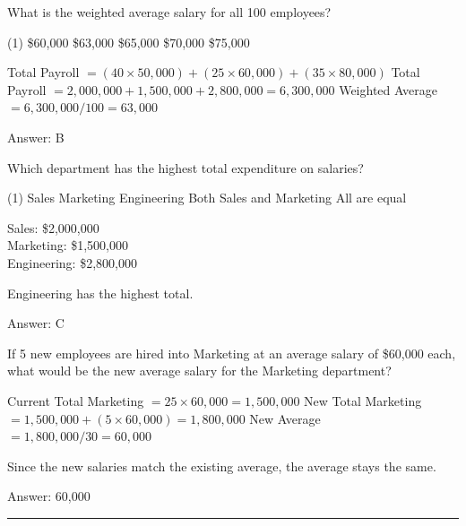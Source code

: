 \documentclass[11pt,paper=a4,answers]{exam}
\begin{document}
\begin{questions}
\question
What is the weighted average salary for all 100 employees?

\begin{tasks}(1)
\task[A)] \$60,000 \task[B)] \$63,000 \task[C)] \$65,000 \task[D)] \$70,000 \task[E)] \$75,000
\end{tasks}

\begin{solution}
\begin{center}
Total Payroll $= (40 \times 50,000) + (25 \times 60,000) + (35 \times 80,000)$
\vspace{5pt}
Total Payroll $= 2,000,000 + 1,500,000 + 2,800,000 = 6,300,000$
\vspace{5pt}
Weighted Average $= 6,300,000 / 100 = 63,000$
\end{center}

Answer: \colorbox{yellow!100}{B}
\end{solution}

\vspace{1cm}

\question
Which department has the highest total expenditure on salaries?

\begin{tasks}(1)
\task[A)] Sales \task[B)] Marketing \task[C)] Engineering \task[D)] Both Sales and Marketing \task[E)] All are equal
\end{tasks}

\begin{solution}
\begin{center}
Sales: \$2,000,000 \\
Marketing: \$1,500,000 \\
Engineering: \$2,800,000
\end{center}
Engineering has the highest total.

Answer: \colorbox{yellow!100}{C}
\end{solution}

\vspace{1cm}

\question
If 5 new employees are hired into Marketing at an average salary of \$60,000 each, what would be the new average salary for the Marketing department?

\begin{solution}
\begin{center}
Current Total Marketing $= 25 \times 60,000 = 1,500,000$
\vspace{5pt}
New Total Marketing $= 1,500,000 + (5 \times 60,000) = 1,800,000$
\vspace{5pt}
New Average $= 1,800,000 / 30 = 60,000$
\end{center}
Since the new salaries match the existing average, the average stays the same.

Answer: \colorbox{yellow!100}{60,000}
\end{solution}


\end{questions}
\begin{center}
\rule{.5\textwidth}{1pt}
\end{center}
\end{document}
